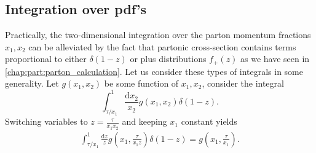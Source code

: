 \documentclass[../main.tex]{subfiles}
\begin{document}
\subsection{Integration over pdf's}
Practically, the two-dimensional integration over the parton momentum fractions \(x_1, x_2\) can be alleviated by the fact that partonic cross-section contains terms proportional to either \(\delta(1-z)\) or plus distributions \(f_+(z)\) as we have seen in \cref{chap:part:parton_calculation}.
Let us consider these types of integrals in some generality.
Let \(g(x_1, x_2)\) be some function of \(x_1, x_2\), consider the integral
\begin{equation}
  \int_{\tau/x_1}^1 \! \frac{\mathrm{d}x_2}{x_2} g(x_1, x_2) \delta(1-z).
\end{equation}
Switching variables to \(z = \frac{\tau}{x_1 x_2}\) and keeping \(x_1\) constant yields
\begin{align}
  \int_{\tau/x_1}^1 \! \frac{\mathrm{d}z}{z}  g(x_1, \frac{\tau}{x_1 z}) \delta(1-z) = g(x_1, \frac{\tau}{x_1}).
\end{align}
\end{document}
